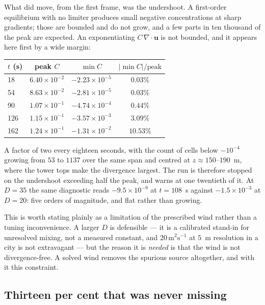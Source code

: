 \documentclass[11pt,a4paper]{article}
\newcommand{\uu}{\bm{u}}
\begin{document}
What did move, from the first frame, was the undershoot. A first-order
equilibrium with no limiter produces small negative concentrations at sharp
gradients; those are bounded and do not grow, and a few parts in ten thousand of
the peak are expected. An exponentiating $C\,\nabla\!\cdot\!\uu$ is not bounded,
and it appears here first by a wide margin:

\begin{center}
\begin{tabular}{lccc}
\toprule
$t$ (s) & peak $C$ & $\min C$ & $|\min C|/\mathrm{peak}$ \\
\midrule
 18 & $6.40\times10^{-2}$ & $-2.23\times10^{-5}$ & $0.03\%$ \\
 54 & $8.63\times10^{-2}$ & $-2.81\times10^{-5}$ & $0.03\%$ \\
 90 & $1.07\times10^{-1}$ & $-4.74\times10^{-4}$ & $0.44\%$ \\
126 & $1.15\times10^{-1}$ & $-3.57\times10^{-3}$ & $3.09\%$ \\
162 & $1.24\times10^{-1}$ & $-1.31\times10^{-2}$ & $10.53\%$ \\
\bottomrule
\end{tabular}
\end{center}

\noindent A factor of two every eighteen seconds, with the count of cells below
$-10^{-4}$ growing from $53$ to $1137$ over the same span and centred at
$z\approx150$--$190$~m, where the tower tops make the divergence largest. The
run is therefore stopped on the undershoot exceeding half the peak, and warns at
one twentieth of it. At $D=35$ the same diagnostic reads $-9.5\times10^{-9}$ at
$t=108$~s against $-1.5\times10^{-3}$ at $D=20$: five orders of magnitude, and
flat rather than growing.

This is worth stating plainly as a limitation of the prescribed wind rather than
a tuning inconvenience. A larger $D$ is defensible ---
it is a calibrated stand-in for unresolved mixing, not a measured constant, and
$20\,\mathrm{m^2s^{-1}}$ at $5$~m resolution in a city is not extravagant ---
but the reason it is \emph{needed} is that the wind is not divergence-free. A
solved wind removes the spurious source altogether, and with it this constraint.

\subsection{Thirteen per cent that was never missing}
\label{sec:wallslots}
\end{document}
